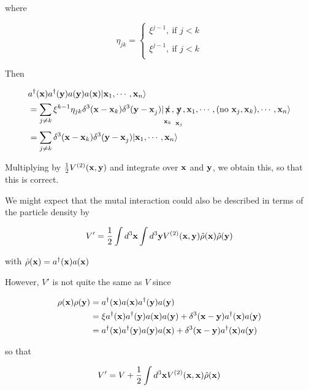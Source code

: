 where

\[\eta_{jk}=\begin{cases}
\xi^{j-1},\ \text{if }j<k\\
\ \\
\xi^{j-1},\ \text{if }j<k\\
\end{cases} \]

Then

\begin{align}
\begin{split}
&a^\dagger({\bf x})a^\dagger({\bf y})a({\bf y})a({\bf x})|{\bf x}_1,\cdots,{\bf x}_n\rangle\\
&=\sum_{j\neq k}\xi^{k-1}\eta_{jk}\delta^3({\bf x - x}_k)\delta^3({\bf y - x}_j)|\underset{{\bf x}_k}{\xout{\bf x}},\underset{{\bf x}_j}{\xout{\bf y}},{\bf x}_1,\cdots,(\text{no }{\bf x}_j,{\bf x}_k),\cdots,{\bf x}_n\rangle\\
&=\sum_{j\neq k}\delta^3({\bf x-x}_k)\delta^3({\bf y - x}_j)|{\bf x}_1,\cdots,{\bf x}_n\rangle
\end{split}
\end{align}

Multiplying by $\frac{1}{2}V^{(2)}(\bf x,y)$ and integrate over $\bf x$ and $\bf y$, we obtain this, so that this is correct. 

We might expect that the mutal interaction could also be described in terms of the particle density by

\begin{align}
V'=\frac{1}{2}\int d^3{\bf x}\int d^3{\bf y}V^{(2)}({\bf x,y})\hat{\rho}({\bf x})\hat{\rho}(\bf y)
\end{align}

with $\hat{\rho}({\bf x}) = a^\dagger({\bf x})a(\bf x)$

However, $V'$ is not quite the same as $V$ since 

\[\begin{split}
\rho({\bf x})\rho({\bf y}) &= a^\dagger({\bf x})a({\bf x})a^\dagger({\bf y})a({\bf y})\\
&=\xi a^\dagger({\bf x})a^\dagger({\bf y})a({\bf x})a({\bf y}) + \delta^3({\bf x-y})a^\dagger({\bf x})a({\bf y})\\
&= a^\dagger({\bf x})a^\dagger({\bf y})a({\bf y})a({\bf x}) + \delta^3({\bf x-y})a^\dagger({\bf x})a({\bf y})
\end{split}\]

so that

\[V' = V+\frac{1}{2}\int d^3{\bf x}V^{(2)}({\bf x,x})\hat{\rho}(\bf x) \]

